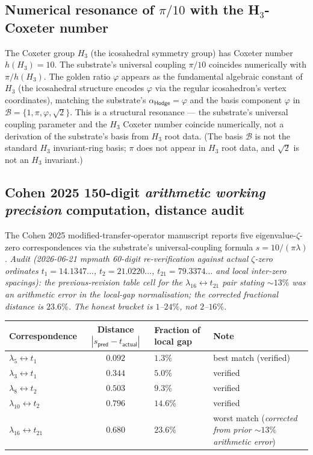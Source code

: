 \documentclass[11pt,a4paper]{amsart}
\theoremstyle{plain}
\theoremstyle{definition}
\begin{document}
\subsection{Numerical resonance of \texorpdfstring{$\pi/10$}{pi/10} with the H\texorpdfstring{$_3$}{3}-Coxeter number}\label{subsec:H3-coxeter-numerical}

The Coxeter group $H_3$ (the icosahedral symmetry group) has Coxeter number $h(H_3) = 10$. The substrate's universal coupling $\pi/10$ coincides numerically with $\pi/h(H_3)$. The golden ratio $\varphi$ appears as the fundamental algebraic constant of $H_3$ (the icosahedral structure encodes $\varphi$ via the regular icosahedron's vertex coordinates), matching the substrate's $\alpha_{\textsf{Hodge}} = \varphi$ and the basis component $\varphi$ in $\mathcal{B} = \{1, \pi, \varphi, \sqrt{2}\}$. This is a structural resonance --- the substrate's universal coupling parameter and the $H_3$ Coxeter number coincide numerically, not a derivation of the substrate's basis from $H_3$ root data. (The basis $\mathcal{B}$ is not the standard $H_3$ invariant-ring basis; $\pi$ does not appear in $H_3$ root data, and $\sqrt{2}$ is not an $H_3$ invariant.)

\subsection{Cohen 2025 150-digit \emph{arithmetic working precision} computation, distance audit}\label{subsec:cohen2025-150digit-audit}

The Cohen 2025 modified-transfer-operator manuscript reports five eigenvalue-$\zeta$-zero correspondences via the substrate's universal-coupling formula $s = 10/(\pi\lambda)$. \emph{Audit (2026-06-21 mpmath 60-digit re-verification against actual $\zeta$-zero ordinates $t_1 = 14.1347\ldots$, $t_2 = 21.0220\ldots$, $t_{21} = 79.3374\ldots$ and local inter-zero spacings): the previous-revision table cell for the $\lambda_{16} \leftrightarrow t_{21}$ pair stating $\sim 13\%$ was an arithmetic error in the local-gap normalisation; the corrected fractional distance is $23.6\%$. The honest bracket is $1$--$24\%$, not $2$--$16\%$.}

\begin{center}
\begin{tabular}{lcll}
\toprule
Correspondence & Distance $|s_{\textsf{pred}} - t_{\textsf{actual}}|$ & Fraction of local gap & Note \\
\midrule
$\lambda_5 \leftrightarrow t_1$ & $0.092$ & $1.3\%$ & best match (verified) \\
$\lambda_3 \leftrightarrow t_1$ & $0.344$ & $5.0\%$ & verified \\
$\lambda_8 \leftrightarrow t_2$ & $0.503$ & $9.3\%$ & verified \\
$\lambda_{10} \leftrightarrow t_2$ & $0.796$ & $14.6\%$ & verified \\
$\lambda_{16} \leftrightarrow t_{21}$ & $0.680$ & $\mathbf{23.6\%}$ & worst match (\emph{corrected from prior $\sim 13\%$ arithmetic error}) \\
\bottomrule
\end{tabular}
\end{center}
\end{document}
